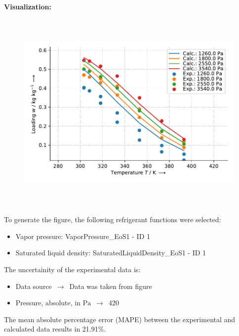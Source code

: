 \textbf{Visualization:}
%
\begin{figure}[!htp]
{\noindent\includegraphics[height=10cm, keepaspectratio]{figs/ads/ads_Ethanol_activated_carbon_FR20_DubininAstakhov_1.pdf}}
\end{figure}
%

To generate the figure, the following refrigerant functions were selected:
\begin{itemize}
\item Vapor pressure: VaporPressure\_EoS1 - ID 1
\item Saturated liquid density: SaturatedLiquidDensity\_EoS1 - ID 1
\end{itemize}

The uncertainity of the experimental data is:
\begin{itemize}
\item Data source $\,\to\,$ Data was taken from figure
\item Pressure, absolute, in $\si{\pascal}$ $\,\to\,$ 420
\end{itemize}

The mean absolute percentage error (MAPE) between the experimental and calculated data results in 21.91\%.
\FloatBarrier
\newpage
